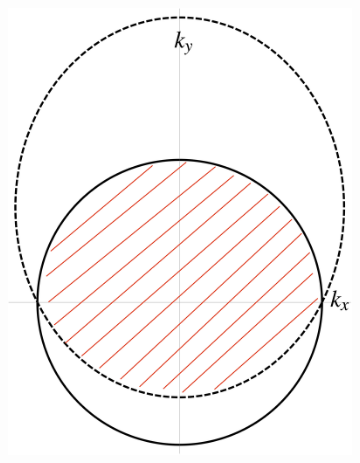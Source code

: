     \begin{figure}[H] 
        \centering
            \begin{subfigure}[b]{0.4\linewidth}
                \includegraphics[width=\linewidth]{fig/Fermi surface.png}
                \caption{}
                \label{fig:fermi surface}
            \end{subfigure}
            \begin{subfigure}[b]{0.3\linewidth}

\end{subfigure}
\end{figure}
